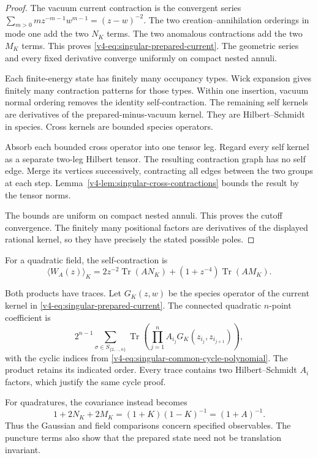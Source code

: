 \begin{proof}
The vacuum current contraction is the convergent
series \(\sum_{m>0}m z^{-m-1}w^{m-1}=(z-w)^{-2}\).
The two creation--annihilation orderings in
mode one add the two \(N_K\) terms.
The two anomalous contractions add the
two \(M_K\) terms.
This proves \eqref{v4-eq:singular-prepared-current}.
The geometric series and every fixed derivative
converge uniformly on compact nested annuli.

Each finite-energy state has finitely many
occupancy types. Wick expansion gives finitely
many contraction patterns for those types.
Within one insertion, vacuum normal ordering
removes the identity self-contraction.
The remaining self kernels are derivatives
of the prepared-minus-vacuum kernel.
They are Hilbert--Schmidt in species.
Cross kernels are bounded species operators.

Absorb each bounded cross operator into
one tensor leg. Regard every self kernel
as a separate two-leg Hilbert tensor.
The resulting contraction graph has no
self edge. Merge its vertices successively,
contracting all edges between the two
groups at each step.
Lemma~\ref{v4-lem:singular-cross-contractions}
bounds the result by the tensor norms.

The bounds are uniform on compact nested annuli.
This proves the cutoff convergence.
The finitely many positional factors are
derivatives of the displayed rational kernel,
so they have precisely the stated possible poles.
\end{proof}

For a quadratic field, the self-contraction is
\begin{equation}\label{v4-eq:singular-prepared-quadratic}
 \langle W_A(z)\rangle_K
      =2z^{-2}\operatorname{Tr}(AN_K)
            +(1+z^{-4})\operatorname{Tr}(AM_K).
\end{equation}

Both products have traces. Let \(G_K(z,w)\)
be the species operator of the current kernel
in \eqref{v4-eq:singular-prepared-current}.
The connected quadratic \(n\)-point coefficient is
\[
 2^{n-1}\sum_{\sigma\in S_{\{2,\ldots,n\}}}
       \operatorname{Tr}
          \left(\prod_{j=1}^n
                  A_{i_j}G_K(z_{i_j},z_{i_{j+1}})\right),
\]
with the cyclic indices from
\eqref{v4-eq:singular-common-cycle-polynomial}.
The product retains its indicated order.
Every trace contains two Hilbert--Schmidt
\(A_i\) factors, which justify the same cycle proof.

For quadratures, the covariance instead becomes
\[
 1+2N_K+2M_K=(1+K)(1-K)^{-1}=(1+A)^{-1}.
\]
Thus the Gaussian and field comparisons concern
specified observables. The puncture terms also
show that the prepared state need not be
translation invariant.

